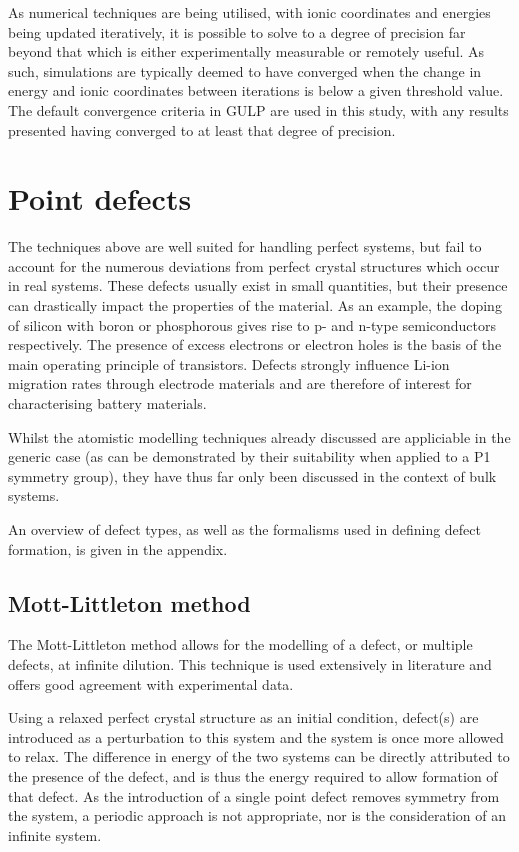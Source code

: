 As numerical techniques are being utilised, with ionic coordinates and energies being updated iteratively, it is possible to solve to a degree of precision far beyond that which is either experimentally measurable or remotely useful.
As such, simulations are typically deemed to have converged when the change in energy and ionic coordinates between iterations is below a given threshold value.
The default convergence criteria in GULP are used in this study, with any results presented having converged to at least that degree of precision.

\section{Point defects}
The techniques above are well suited for handling perfect systems, but fail to account for the numerous deviations from perfect crystal structures which occur in real systems.
These defects usually exist in small quantities, but their presence can drastically impact the properties of the material.
As an example, the doping of silicon with boron or phosphorous gives rise to p- and n-type semiconductors respectively.
The presence of excess electrons or electron holes is the basis of the main operating principle of transistors.
Defects strongly influence Li-ion migration rates through electrode materials and are therefore of interest for characterising battery materials.

Whilst the atomistic modelling techniques already discussed are appliciable in the generic case (as can be demonstrated by their suitability when applied to a P1 symmetry group), they have thus far only been discussed in the context of bulk systems.

An overview of defect types, as well as the formalisms used in defining defect formation, is given in the appendix.

\subsection{Mott-Littleton method}
The Mott-Littleton method allows for the modelling of a defect, or multiple defects, at infinite dilution.
This technique is used extensively in literature\cite{Fisher2008} and offers good agreement with experimental data.

Using a relaxed perfect crystal structure as an initial condition, defect(s) are introduced as a perturbation to this system and the system is once more allowed to relax.
The difference in energy of the two systems can be directly attributed to the presence of the defect, and is thus the energy required to allow formation of that defect.
As the introduction of a single point defect removes symmetry from the system, a periodic approach is not appropriate, nor is the consideration of an infinite system.

